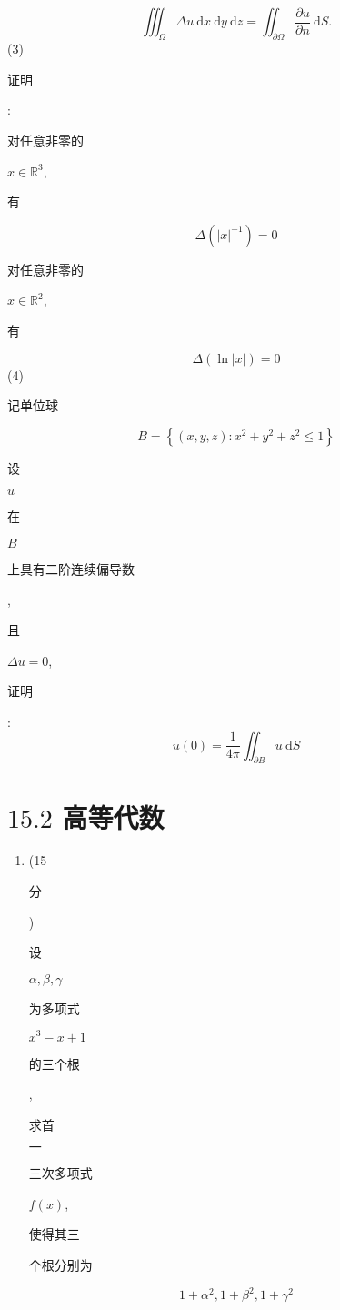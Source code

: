 \documentclass[10pt]{article}
\begin{document}
$$
\iiint_{\Omega} \Delta u \mathrm{~d} x \mathrm{~d} y \mathrm{~d} z=\iint_{\partial \Omega} \frac{\partial u}{\partial n} \mathrm{~d} S .
$$
(3) \begin{CJK}{UTF8}{mj}证明\end{CJK}: \begin{CJK}{UTF8}{mj}对任意非零的\end{CJK} $x \in \mathbb{R}^{3}$, \begin{CJK}{UTF8}{mj}有\end{CJK}
$$
\Delta\left(|x|^{-1}\right)=0
$$
\begin{CJK}{UTF8}{mj}对任意非零的\end{CJK} $x \in \mathbb{R}^{2}$, \begin{CJK}{UTF8}{mj}有\end{CJK}
$$
\Delta(\ln |x|)=0
$$
(4) \begin{CJK}{UTF8}{mj}记单位球\end{CJK}
$$
B=\left\{(x, y, z): x^{2}+y^{2}+z^{2} \leq 1\right\}
$$
\begin{CJK}{UTF8}{mj}设\end{CJK} $u$ \begin{CJK}{UTF8}{mj}在\end{CJK} $B$ \begin{CJK}{UTF8}{mj}上具有二阶连续偏导数\end{CJK}, \begin{CJK}{UTF8}{mj}且\end{CJK} $\Delta u=0$, \begin{CJK}{UTF8}{mj}证明\end{CJK}:
$$
u(0)=\frac{1}{4 \pi} \iint_{\partial B} u \mathrm{~d} S
$$

\section{$15.2$ 高等代数}
\begin{enumerate}
  \item (15 \begin{CJK}{UTF8}{mj}分\end{CJK}) \begin{CJK}{UTF8}{mj}设\end{CJK} $\alpha, \beta, \gamma$ \begin{CJK}{UTF8}{mj}为多项式\end{CJK} $x^{3}-x+1$ \begin{CJK}{UTF8}{mj}的三个根\end{CJK}, \begin{CJK}{UTF8}{mj}求首\end{CJK} $一$ \begin{CJK}{UTF8}{mj}三次多项式\end{CJK} $f(x)$, \begin{CJK}{UTF8}{mj}使得其三\end{CJK} \begin{CJK}{UTF8}{mj}个根分别为\end{CJK}
\end{enumerate}
$$
1+\alpha^{2}, 1+\beta^{2}, 1+\gamma^{2}
$$
\end{document}
